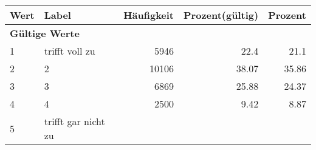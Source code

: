     \begin{longtable}{lXrrr}
     \toprule
     \textbf{Wert} & \textbf{Label} & \textbf{Häufigkeit} & \textbf{Prozent(gültig)} & \textbf{Prozent} \\
     \endhead
     \midrule
     \multicolumn{5}{l}{\textbf{Gültige Werte}}\\

     1 &
     \multicolumn{1}{X}{ trifft voll zu   } &


       \num{5946} &
       \num[round-mode=places,round-precision=2]{22.4} &
         \num[round-mode=places,round-precision=2]{21.1} \\

     2 &
     \multicolumn{1}{X}{ 2   } &


       \num{10106} &
       \num[round-mode=places,round-precision=2]{38.07} &
         \num[round-mode=places,round-precision=2]{35.86} \\

     3 &
     \multicolumn{1}{X}{ 3   } &


       \num{6869} &
       \num[round-mode=places,round-precision=2]{25.88} &
         \num[round-mode=places,round-precision=2]{24.37} \\

     4 &
     \multicolumn{1}{X}{ 4   } &


       \num{2500} &
       \num[round-mode=places,round-precision=2]{9.42} &
         \num[round-mode=places,round-precision=2]{8.87} \\

     5 &
     \multicolumn{1}{X}{ trifft gar nicht zu   } &



\end{longtable}
